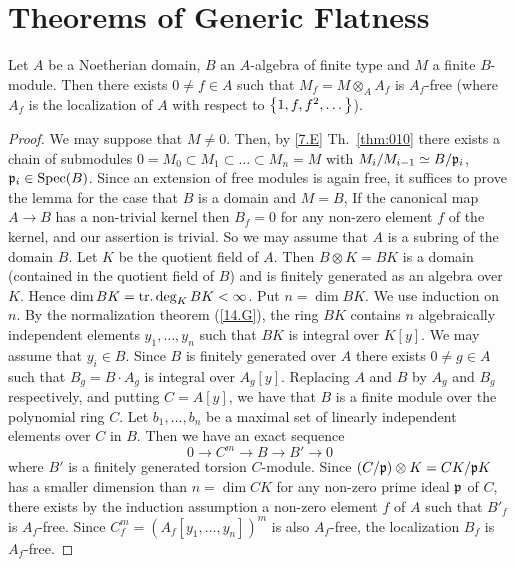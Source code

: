 \documentclass[../main]{subfiles}
\begin{document}
\section{Theorems of Generic Flatness}\label{sec:22}

\begin{parlemma}
\label{lem:22.01}
    Let $A$ be a Noetherian domain, $B$ an $A$-algebra of finite type and $M$ a finite $B$-module. Then there exists $0\neq f \in A$ such that $M_f = M\otimes_A A_f$ is $A_f$-free (where $A_f$ is the localization of $A$ with respect to $\left\{1, f, f^2, \dots\right\}$). 
\end{parlemma}
\begin{proof}
    We may suppose that $M \neq 0$. Then, by \ref{7.E} Th.~\ref{thm:010} there exists a chain of submodules $0=M_0\subset M_1 \subset \dots \subset M_n=M$ with $M_i/M_{i-1}\simeq B/\mathfrak{p}_i$, $\mathfrak{p}_i\in \operatorname{Spec}(B)$. Since an extension of free modules is again free, it suffices to prove the lemma for the case that $B$ is a domain and $M=B$, If the canonical map $A\longrightarrow B$ has a non-trivial kernel then $B_f = 0$ for any non-zero element $f$ of the kernel, and our assertion is trivial. So we may assume that $A$ is a subring of the domain $B$. Let $K$ be the quotient field of $A$. Then $B\otimes K = BK$ is a domain (contained in the quotient field of $B$) and is finitely generated as an algebra over $K$. Hence $\operatorname{dim} BK = \operatorname{tr. deg}_K BK < \infty$. Put $n = \dim BK$. We use induction on $n$. By the normalization theorem (\ref{14.G}), the ring $BK$ contains $n$ algebraically independent elements $y_1, \dots, y_n$ such that $BK$ is integral over $K[y]$. We may assume that $y_i \in B$. Since $B$ is finitely generated over $A$ there exists $0 \neq g \in A$ such that $B_g = B\cdot A_g$ is integral over $A_g[y]$. Replacing $A$ and $B$ by $A_g$ and $B_g$ respectively, and putting $C = A[y]$, we have that $B$ is a finite module over the polynomial ring $C$. Let $b_1, \dots, b_n$ be a maximal set of linearly independent elements over $C$ in $B$. Then we have an exact sequence \[0\longrightarrow C^m\longrightarrow B\longrightarrow B'\longrightarrow 0\] where $B'$ is a finitely generated torsion $C$-module. Since $\left(C/\mathfrak{p}\right)\otimes K = CK/\mathfrak{p}K$ has a smaller dimension than $n=\dim CK$ for any non-zero prime ideal $\mathfrak{p}$ of $C$, there exists by the induction assumption a non-zero element $f$ of $A$ such that ${B'}_f$ is $A_f$-free.
    Since $C_f^m=(A_f[y_1,\ldots,y_n])^m$ is also $A_f$-free, the localization $B_f$ is $A_f$-free.
\end{proof}
\end{document}
